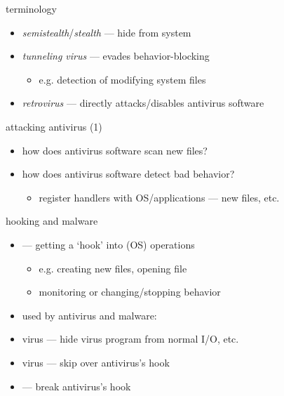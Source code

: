 
\begin{frame}{terminology}
    \begin{itemize}
    \item \textit{semistealth}/\textit{stealth} --- hide from system
    \item \textit{tunneling virus} --- evades behavior-blocking
        \begin{itemize}
        \item e.g. detection of modifying system files
        \end{itemize}
    \item \textit{retrovirus} --- directly attacks/disables antivirus software
    \end{itemize}
\end{frame}

\begin{frame}{attacking antivirus (1)}
    \begin{itemize}
    \item how does antivirus software scan new files?
    \item how does antivirus software detect bad behavior?
        \begin{itemize}
        \item register handlers with OS/applications --- new files, etc.
        \end{itemize}
    \end{itemize}
\end{frame}

\begin{frame}[label=hookingReason]{hooking and malware}
    \begin{itemize}
    \item {} --- getting a `hook' into (OS) operations
        \begin{itemize}
        \item e.g. creating new files, opening file
        \item monitoring or changing/stopping behavior
        \end{itemize}
    \item used by antivirus and malware:
    \vspace{.5cm}
    \item {} virus --- hide virus program from normal I/O, etc.
    \item {} virus --- skip over antivirus's hook
    \item {} --- break antivirus's hook
    \end{itemize}
\end{frame}

